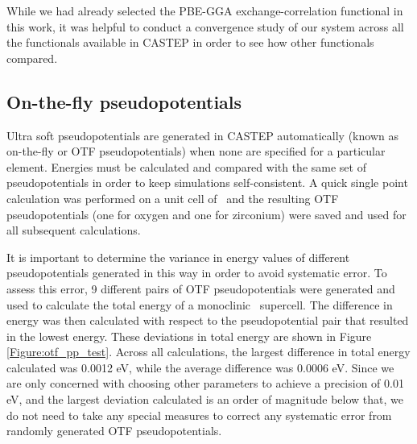 While we had already selected the PBE-GGA exchange-correlation functional in this work, it was helpful to conduct a convergence study of our system across all the functionals available in CASTEP in order to see how other functionals compared.

\subsection{On-the-fly pseudopotentials}

Ultra soft pseudopotentials are generated in CASTEP automatically (known as on-the-fly or OTF pseudopotentials) when none are specified for a particular element. Energies must be calculated and compared with the same set of pseudopotentials in order to keep simulations self-consistent. A quick single point calculation was performed on a unit cell of \zirconia\ and the resulting OTF pseudopotentials (one for oxygen and one for zirconium) were saved and used for all subsequent calculations. 

It is important to determine the variance in energy values of different pseudopotentials generated in this way in order to avoid systematic error. To assess this error, 9 different pairs of OTF pseudopotentials were generated and used to calculate the total energy of a monoclinic \zirconia\ supercell. The difference in energy was then calculated with respect to the pseudopotential pair that resulted in the lowest energy. These deviations in total energy are shown in Figure \ref{Figure:otf_pp_test}. Across all calculations, the largest difference in total energy calculated was 0.0012 eV, while the average difference was 0.0006 eV. Since we are only concerned with choosing other parameters to achieve a precision of 0.01 eV, and the largest deviation calculated is an order of magnitude below that, we do not need to take any special measures to correct any systematic error from randomly generated OTF pseudopotentials.


